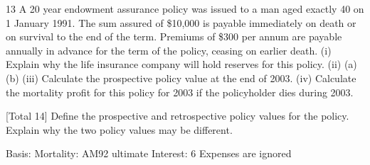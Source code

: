 \documentclass[a4paper,12pt]{article}
\begin{document}
13
A 20 year endowment assurance policy was issued to a man aged exactly 40 on
1 January 1991. The sum assured of \$10,000 is payable immediately on death or on
survival to the end of the term.
Premiums of \$300 per annum are payable annually in advance for the term of the
policy, ceasing on earlier death.
(i) Explain why the life insurance company will hold reserves for this policy. 
(ii) (a)
(b)
(iii) Calculate the prospective policy value at the end of 2003.
(iv) Calculate the mortality profit for this policy for 2003 if the policyholder dies
during 2003.

[Total 14]
Define the prospective and retrospective policy values for the policy.
Explain why the two policy values may be different.

Basis: Mortality: AM92 ultimate
Interest: 6%
Expenses are ignored
\end{document}
